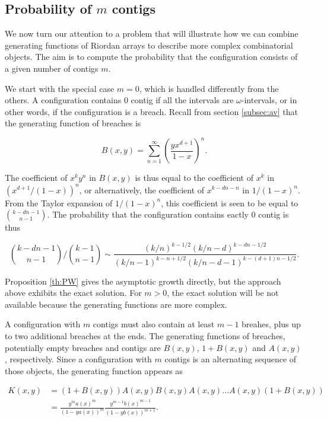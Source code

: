 \documentclass{article}
\begin{document}
\subsection{Probability of $m$ contigs}
\label{subsec:probmcontigs}

We now turn our attention to a problem that will illustrate how we can
combine generating functions of Riordan arrays to describe more complex
combinatorial objects. The aim is to compute the probability that the
configuration consists of a given number of contigs $m$.

We start with the special case $m = 0$, which is handled differently from
the others. A configuration contains $0$ contig if all the intervals are
$\omega$-intervals, or in other words, if the configuration is a breach.
Recall from section \ref{subsec:av} that the generating function of
breaches is

\begin{equation*}
B(x,y) = \sum_{n=1}^\infty \left( \frac{yx^{d+1}}{1-x} \right )^n.
\end{equation*}

The coefficient of $x^ky^n$ in $B(x,y)$ is thus equal to the coefficient
of $x^k$ in $\left(x^{d+1}/(1-x)\right)^n$, or alternatively, the
coefficient of $x^{k-dn-n}$ in $1/(1-x)^n$. From the Taylor expansion of
$1/(1-x)^n$, this coefficient is seen to be equal to ${k-dn-1 \choose
n-1}$. The probability that the configuration contains eactly $0$ contig
is thus

\begin{equation}
\label{eq:m=0}
{k-dn-1 \choose n-1} \Big/ {k-1 \choose n-1} \sim 
\frac{(k/n)^{k-1/2}(k/n-d)^{k-dn-1/2}}
 {(k/n-1)^{k-n+1/2}(k/n-d-1)^{k-(d+1)n-1/2}}.
\end{equation}

Proposition \ref{th:PW} gives the asymptotic growth directly, but the
approach above exhibits the exact solution. For $m > 0$, the exact
solution will be not available because the generating functions are
more complex.

A configuration with $m$ contigs must also contain at least $m-1$
breahes, plus up to two additional breaches at the ends. The generating
functions of breaches, potentially empty breaches and contigs are
$B(x,y)$, $1+B(x,y)$ and $A(x,y)$, respectively. Since a configuration
with $m$ contigs is an alternating sequence of those objects, the
generating function appears as

\begin{equation*}
\begin{split}
K(x,y) &= (1+B(x,y)) A(x,y) B(x,y) A(x,y) \ldots A(x,y) (1+B(x,y)) \\
&= \frac{y^ma(x)^m}{(1-ya(x))^m}
\frac{y^{m-1}b(x)^{m-1}}{(1-yb(x))^{m+1}}.
\end{split}
\end{equation*}
\end{document}

